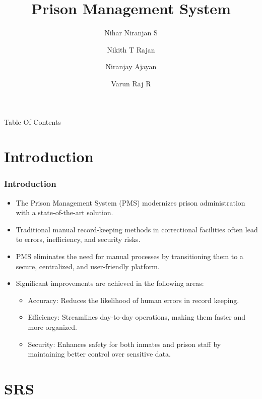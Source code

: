 \documentclass[aspectratio=169]{beamer}
\title{Prison Management System}
\author{Nihar Niranjan S \and Nikith T Rajan \and Niranjay Ajayan \and Varun Raj R}
\institute{
	Department of Computer Engineering\\
	Model Engineering College\\
	Thrikkakara, Kochi 682021\\
}
\begin{document}
\begin{frame}[plain]
    \maketitle
\end{frame}
\begin{frame}{Table Of Contents}
    \tableofcontents
    
\end{frame}
\section{Introduction}
\begin{frame}
    \frametitle{Introduction}
    \begin{itemize}
        \item The Prison Management System (PMS) modernizes prison administration with a state-of-the-art solution.
        \item Traditional manual record-keeping methods in correctional facilities often lead to errors, inefficiency, and security risks.
        \item PMS eliminates the need for manual processes by transitioning them to a secure, centralized, and user-friendly platform.
        \item Significant improvements are achieved in the following areas:
        \begin{itemize}
            \item Accuracy: Reduces the likelihood of human errors in record keeping.
            \item Efficiency: Streamlines day-to-day operations, making them faster and more organized.
            \item Security: Enhances safety for both inmates and prison staff by maintaining better control over sensitive data.
        \end{itemize}
    \end{itemize}
\end{frame}
\section{SRS}
\end{document}
